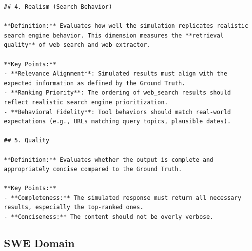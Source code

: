 \documentclass{llmxive}
\begin{document}
\begin{lstlisting}
## 4. Realism (Search Behavior)

**Definition:** Evaluates how well the simulation replicates realistic search engine behavior. This dimension measures the **retrieval quality** of web_search and web_extractor.

**Key Points:**
- **Relevance Alignment**: Simulated results must align with the expected information as defined by the Ground Truth.
- **Ranking Priority**: The ordering of web_search results should reflect realistic search engine prioritization.
- **Behavioral Fidelity**: Tool behaviors should match real-world expectations (e.g., URLs matching query topics, plausible dates).

## 5. Quality

**Definition:** Evaluates whether the output is complete and appropriately concise compared to the Ground Truth.

**Key Points:**
- **Completeness:** The simulated response must return all necessary results, especially the top-ranked ones.
- **Conciseness:** The content should not be overly verbose.
\end{lstlisting}

\subsection{SWE Domain}
\label{sec:appendix:judge_swe}
\end{document}
